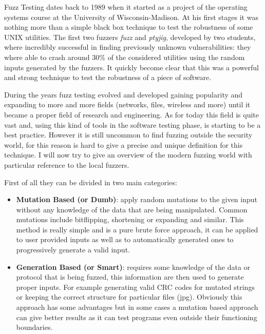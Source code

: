 \documentclass[../main.tex]{subfiles}
\begin{document}
Fuzz Testing dates back to 1989 when it started as a project of the operating
systems course at the University of Wisconsin-Madison. At his first stages it
was nothing more than a simple black box technique to test the robustness of
some UNIX utilities. The first two fuzzers \textit{fuzz} and \textit{ptyjig},
developed by two students, where incredibly successful in finding previously
unknown vulnerabilities: they where able to crash around 30\% of the considered
utilities using the random inputs generated by the fuzzers\cite{firstFuzzPaper}.
It quickly become clear that this was a powerful and strong technique to test
the robustness of a piece of software.

During the years fuzz testing evolved and developed gaining popularity and
expanding to more and more fields (networks, files, wireless and more) until it
became a proper field of research and engineering. As for today this field is
quite vast and, using this kind of tools in the software testing phase, is
starting to be a best practice. However it is still uncommon to find fuzzing
outside the security world, for this reason is hard to give a precise and unique
definition for this technique. I will now try to give an overview of the modern
fuzzing world with particular reference to the local fuzzers. %

First of all they can be divided in two main categories:

\begin{itemize}
  \item{\textbf{Mutation Based (or Dumb)}: apply random mutations to the given
  input without any knowledge of the data that are being manipulated. Common
  mutations include bitflipping, shortening or expanding and similar. This
  method is really simple and is a pure brute force approach, it can be applied
  to user provided inputs as well as to automatically generated ones to
  progressively generate a valid input.}

  \item{\textbf{Generation Based (or Smart)}: requires some knowledge of the
  data or protocol that is being fuzzed, this information are then used to
  generate proper inputs. For example generating valid CRC codes for mutated
  strings or keeping the correct structure for particular files (jpg). Obviously this approach has some advantages but in some cases a mutation based approach can give better results as it can test programs even outside their functioning boundaries.} %

\end{itemize}
\end{document}
